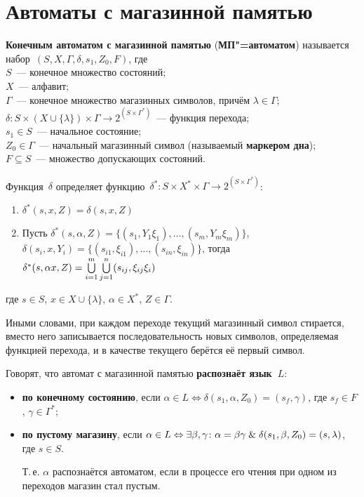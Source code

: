 \section{Автоматы с магазинной памятью}
  \textbf{Конечным автоматом с магазинной памятью} (\textbf{МП"=автоматом}) называется набор~$(S, X, \Gamma, \delta, s_1, Z_0, F)$, где\\
$S$~--- конечное множество состояний;\\
$X$~--- алфавит;\\
$\Gamma$~--- конечное множество магазинных символов, причём $\lambda \in \Gamma$;\\
$\delta \colon S \times (X \cup \{ \lambda \}) \times \Gamma \to 2^{(S \times \Gamma^*)}$~--- функция перехода;\\
$s_1 \in S$~--- начальное состояние;\\
$Z_0 \in \Gamma$~--- начальный магазинный символ (называемый \textbf{маркером дна});\\
$F \subseteq S$~--- множество допускающих состояний.

Функция~$\delta$ определяет функцию~$\delta^* \colon S \times X^* \times \Gamma \to 2^{(S \times \Gamma^*)}$:
\begin{enumerate}
	\item $\delta^*(s, x, Z) = \delta(s, x, Z)$
	\item Пусть $\delta^*(s, \alpha, Z) = \{ (s_1, Y_1 \xi_1), \ldots, (s_m, Y_m \xi_m) \}$,
	$\delta(s_i, x, Y_i) = \{ (s_{i1}, \xi_{i1}), \ldots, (s_{in}, \xi_{in}) \}$,
	тогда
	$\delta^*(s, \alpha x, Z) \opbr= \bigcup\limits_{i=1}^m \bigcup\limits_{j=1}^n (s_{ij}, \xi_{ij} \xi_i)$
\end{enumerate}
где $s \in S$, $x \in X \cup \{ \lambda \}$, $\alpha \in X^*$, $Z \in \Gamma$.

Иными словами, при каждом переходе текущий магазинный символ стирается, вместо него записывается последовательность новых символов, определяемая функцией перехода, и в качестве текущего берётся её первый символ.

Говорят, что автомат с магазинной памятью \textbf{распознаёт язык~$L$}:
\begin{itemize}
	\item \textbf{по конечному состоянию}, если $\alpha \in L \Leftrightarrow \delta(s_1, \alpha, Z_0) = (s_f, \gamma)$, где $s_f \in F$, $\gamma \in \Gamma^*$;
	\item \textbf{по пустому магазину}, если $\alpha \in L \Leftrightarrow \exists \beta, \gamma \colon \alpha = \beta \gamma \mathrel{\&} \delta(s_1, \beta, Z_0) = (s, \lambda)$, где $s \in S$.
	
	Т.\,е. $\alpha$ распознаётся автоматом, если в процессе его чтения при одном из переходов магазин стал пустым.
\end{itemize}

